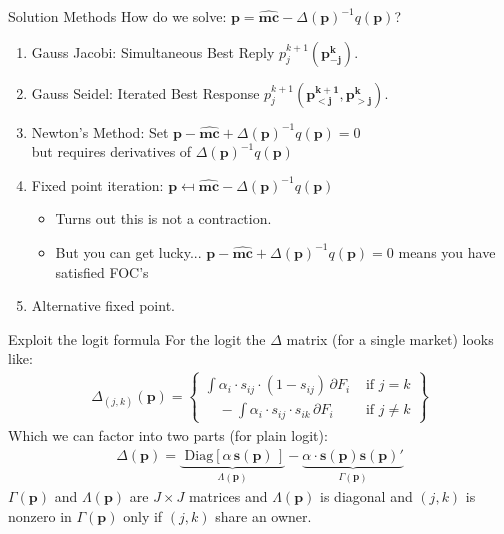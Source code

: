 \begin{frame}{Solution Methods}
How do we solve: $\symbf{p} = \widehat{\symbf{mc}} - \Delta(\symbf{p})^{-1}q(\symbf{p})$?
\begin{enumerate}
\item Gauss Jacobi: Simultaneous Best Reply  $p_j^{k+1}(\symbf{p_{-j}^k})$.
\item Gauss Seidel: Iterated Best Response  $p_j^{k+1}(\symbf{p_{<j}^{k+1}},\symbf{p_{>j}^{k}})$.
\item Newton's Method: Set $\symbf{p} - \widehat{\symbf{mc}} + \Delta(\symbf{p})^{-1}q(\symbf{p})=0$\\ but requires derivatives of $\Delta(\symbf{p})^{-1}q(\symbf{p})$
\item Fixed point iteration: $\symbf{p} \mapsfrom \widehat{\symbf{mc}} - \Delta(\symbf{p})^{-1}q(\symbf{p})$
\begin{itemize}
\item Turns out this is \alert{not a contraction}.
\item But you can get lucky... $\symbf{p} - \widehat{\symbf{mc}} + \Delta(\symbf{p})^{-1}q(\symbf{p})=0$ means you have satisfied FOC's
\end{itemize}
\item Alternative fixed point.
\end{enumerate}
\end{frame} 

\begin{frame}{Exploit the logit formula}
For the logit the $\Delta$ matrix (for a single market) looks like:
\begin{align*}
\Delta_{(j,k)}(\symbf{p}) = \left\{\begin{array}{lr}
       \int \alpha_i \cdot s_{ij}\cdot (1-s_{ij}) \, \partial F_i& \text{ if } j=k \\
          \quad -\int \alpha_i \cdot s_{ij} \cdot s_{ik} \, \partial F_i &  \text{ if }  j\neq k 
        \end{array} \right\}
\end{align*}
Which we can factor into two parts (for plain logit):
\begin{align*}
\Delta(\symbf{p}) =  \underbrace{\text{ Diag}\left[ \alpha \, \symbf{s}(\symbf{p}) \, \right]}_{\Lambda(\symbf{p})} -  \underbrace{\alpha \cdot \symbf{s}(\symbf{p}) \symbf{s}(\symbf{p})'}_{\Gamma(\symbf{p})}
\end{align*}
$\Gamma(\symbf{p})$ and $\Lambda(\symbf{p})$ are $J \times J$ matrices and $\Lambda(\symbf{p})$ is diagonal and $(j,k)$ is nonzero in $\Gamma(\symbf{p})$ only if $(j,k)$ share an owner.
\end{frame}


